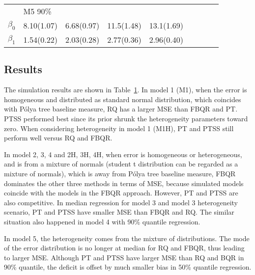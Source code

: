 \documentclass[12pt]{article}
\newcommand{\polya}{P\'{o}lya}
\begin{document}
\begin{center}
\begin{table}[h]
\begin{tabular}[tb]{c|llll|llll}
                & M5 90\%    &            &            &            &            &            &            &            \\
      $\beta_0$ & 8.10(1.07) & 6.68(0.97) & 11.5(1.48) & 13.1(1.69) &            &            &            &            \\
      $\beta_1$ & 1.54(0.22) & 2.03(0.28) & 2.77(0.36) & 2.96(0.40) &            &            &            &            \\
\hline
    \end{tabular}
    \label{ch2:tab:m1}
  \end{table}
\end{center}

\subsection{Results}
The simulation results are shown in Table~\ref{ch2:tab:m1}.  In model 1
(M1), when the error is homogeneous and distributed as standard normal
distribution, which coincides with \polya{} tree baseline measure, RQ
has a larger MSE than FBQR and PT. PTSS performed best since its prior
shrunk the heterogeneity parameters toward zero.  When considering
heterogeneity in model 1 (M1H), PT and PTSS still perform well versus
RQ and FBQR.

In model 2, 3, 4 and 2H, 3H, 4H, when error is homogeneous or
heterogeneous, and is from a mixture of normals (student t
distribution can be regarded as a mixture of normals), which is away
from \polya{} tree baseline measure, FBQR dominates the other three
methods in terms of MSE, because simulated models coincide with the
models in the FBQR approach. However, PT and PTSS are also
competitive.  In median regression for model 3 and model 3
heterogeneity scenario, PT and PTSS have smaller MSE than FBQR and RQ.
The similar situation also happened in model 4 with 90\% quantile
regression.

In model 5, the heterogeneity comes from the mixture of distributions.
The mode of the error distribution is no longer at median for RQ and
FBQR, thus leading to larger MSE. Although PT and PTSS have larger MSE
than RQ and BQR in 90\% quantile, the deficit is offset by much
smaller bias in 50\% quantile regression.
\end{document}
